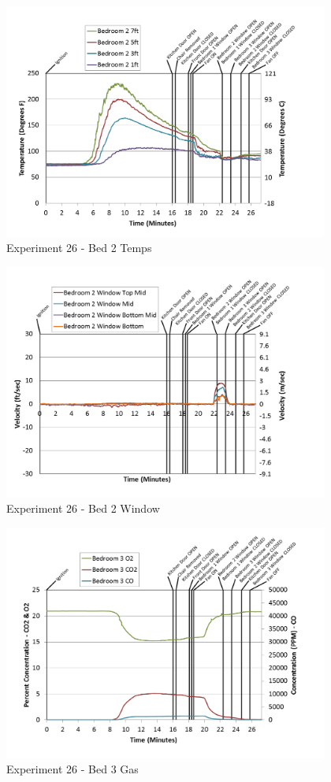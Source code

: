 \documentclass{article}
\begin{document}
\begin{appendices}
\begin{figure}[h!]
	\centering
	\includegraphics[height=3.05in]{0_Images/Results_Charts/Exp_26_Charts/Bed2Temps.png}
	\caption{Experiment 26 - Bed 2 Temps}
\end{figure}

\clearpage

\begin{figure}[h!]
	\centering
	\includegraphics[height=3.05in]{0_Images/Results_Charts/Exp_26_Charts/Bed2Window.png}
	\caption{Experiment 26 - Bed 2 Window}
\end{figure}


\begin{figure}[h!]
	\centering
	\includegraphics[height=3.05in]{0_Images/Results_Charts/Exp_26_Charts/Bed3Gas.png}
	\caption{Experiment 26 - Bed 3 Gas}
\end{figure}


\end{appendices}
\end{document}
